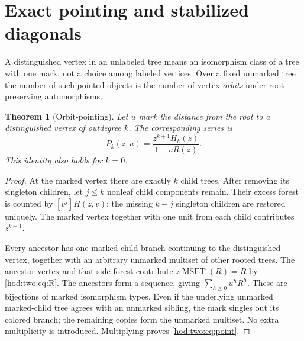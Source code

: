 \documentclass[11pt,letterpaper]{article}
\newtheorem{theorem}{Theorem}[section]
\theoremstyle{definition}\newtheorem{definition}[theorem]{Definition}
\theoremstyle{remark}\newtheorem{remark}[theorem]{Remark}
\newcommand{\MSET}{\operatorname{MSET}}
\begin{document}
\section{Exact pointing and stabilized diagonals}
A distinguished vertex in an unlabeled tree means an isomorphism class of a tree with one mark, not a choice among labeled vertices. Over a fixed unmarked tree the number of such pointed objects is the number of vertex \emph{orbits} under root-preserving automorphisms.

\begin{theorem}[Orbit-pointing]\label{hod:two:thm:point}
Let $u$ mark the distance from the root to a distinguished vertex of outdegree $k$. The corresponding series is
\begin{equation}\label{hod:two:eq:point}
P_k(z,u)=\frac{z^{k+1}H_k(z)}{1-uR(z)}.
\end{equation}
This identity also holds for $k=0$.
\end{theorem}
\begin{proof}
At the marked vertex there are exactly $k$ child trees. After removing its singleton children, let $j\le k$ nonleaf child components remain. Their excess forest is counted by $[v^j]H(z,v)$; the missing $k-j$ singleton children are restored uniquely. The marked vertex together with one unit from each child contributes $z^{k+1}$.

Every ancestor has one marked child branch continuing to the distinguished vertex, together with an arbitrary unmarked multiset of other rooted trees. The ancestor vertex and that side forest contribute $z\MSET(R)=R$ by \eqref{hod:two:eq:R}. The ancestors form a sequence, giving $\sum_{h\ge0}u^hR^h$. These are bijections of marked isomorphism types. Even if the underlying unmarked marked-child tree agrees with an unmarked sibling, the mark singles out its colored branch; the remaining copies form the unmarked multiset. No extra multiplicity is introduced. Multiplying proves \eqref{hod:two:eq:point}.
\end{proof}
\end{document}
